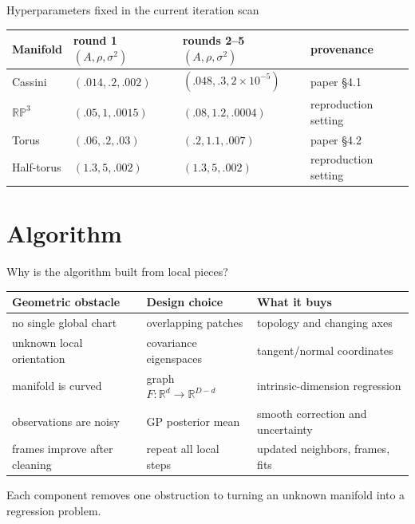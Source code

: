 \documentclass[aspectratio=169,10pt]{beamer}
\newcommand{\HL}[1]{\textcolor{emphasis}{#1}}
\newcommand{\R}{\mathbb R}
\begin{document}
\begin{frame}{Hyperparameters fixed in the current iteration scan}
  \begin{center}
    \small
    \begin{tabular}{lp{}p{}p{}}
      \toprule
      Manifold & round 1 $(A,\rho,\sigma^2)$ & rounds 2--5 $(A,\rho,\sigma^2)$ & provenance\\
      \midrule
      Cassini & $(.014,.2,.002)$ & $(.048,.3,2\!\times\!10^{-5})$ & paper \S4.1\\
      $\mathbb{RP}^{3}$ & $(.05,1,.0015)$ & $(.08,1.2,.0004)$ & reproduction setting\\
      Torus & $(.06,.2,.03)$ & $(.2,1.1,.007)$ & paper \S4.2\\
      Half-torus & $(1.3,5,.002)$ & $(1.3,5,.002)$ & reproduction setting\\
      \bottomrule
    \end{tabular}
  \end{center}
  \vspace{0.35cm}
\end{frame}

\section{Algorithm}

\begin{frame}{Why is the algorithm built from local pieces?}
  \begin{center}
    \small
    \begin{tabular}{p{}p{}p{}}
      \toprule
      Geometric obstacle & Design choice & What it buys\\
      \midrule
      no single global chart & overlapping patches & topology and changing axes\\
      unknown local orientation & covariance eigenspaces & tangent/normal coordinates\\
      manifold is curved & graph $F:\R^d\to\R^{D-d}$ & intrinsic-dimension regression\\
      observations are noisy & GP posterior mean & smooth correction and uncertainty\\
      frames improve after cleaning & repeat all local steps & updated neighbors, frames, fits\\
      \bottomrule
    \end{tabular}
  \end{center}
  \vspace{0.25cm}
  \centering
  \HL{Each component removes one obstruction to turning an unknown manifold into a regression problem.}
\end{frame}
\end{document}
